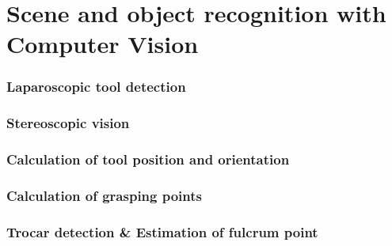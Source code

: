 \section{Scene and object recognition with Computer Vision}

\begin{frame}
\frametitle{Laparoscopic tool detection}
\end{frame}

\begin{frame}
\frametitle{Stereoscopic vision}
\end{frame}

\begin{frame}
\frametitle{Calculation of tool position and orientation}
\end{frame}

\begin{frame}
\frametitle{Calculation of grasping points}
\end{frame}

\begin{frame}
\frametitle{Trocar detection \& Estimation of fulcrum point}
\end{frame}
